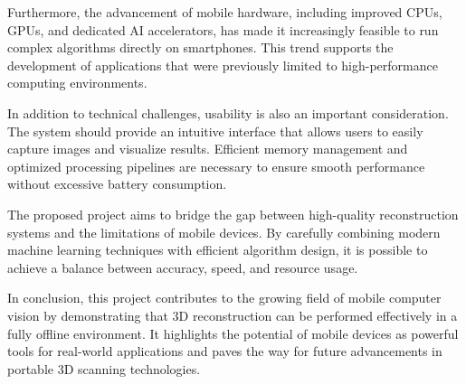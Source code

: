 Furthermore, the advancement of mobile hardware, including improved CPUs, GPUs, and dedicated AI accelerators, has made it increasingly feasible to run complex algorithms directly on smartphones. This trend supports the development of applications that were previously limited to high-performance computing environments.

In addition to technical challenges, usability is also an important consideration. The system should provide an intuitive interface that allows users to easily capture images and visualize results. Efficient memory management and optimized processing pipelines are necessary to ensure smooth performance without excessive battery consumption.

The proposed project aims to bridge the gap between high-quality reconstruction systems and the limitations of mobile devices. By carefully combining modern machine learning techniques with efficient algorithm design, it is possible to achieve a balance between accuracy, speed, and resource usage.

In conclusion, this project contributes to the growing field of mobile computer vision by demonstrating that 3D reconstruction can be performed effectively in a fully offline environment. It highlights the potential of mobile devices as powerful tools for real-world applications and paves the way for future advancements in portable 3D scanning technologies.

